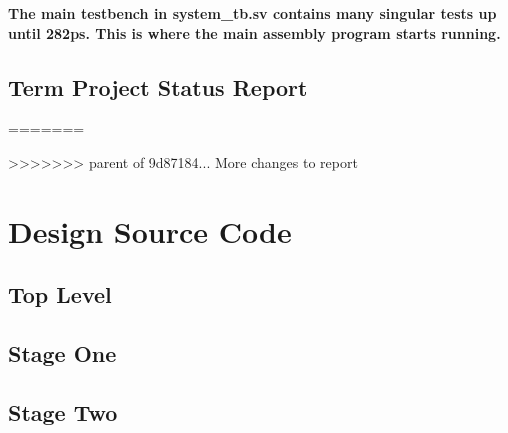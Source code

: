         \textbf{The main testbench in system\_tb.sv contains many singular tests up until 282ps. This is where the main assembly program starts running. }
        
        

	\subsection{Term Project Status Report}
	\onecolumn
	
    
    
=======
	
>>>>>>> parent of 9d87184... More changes to report

    \section{Design Source Code}
        \subsection{Top Level}
        
        
        

        \subsection{Stage One}
        
        
        
        
              
        
        
        
        
        
        
        
              
        

        \subsection{Stage Two}
                
                   
        
